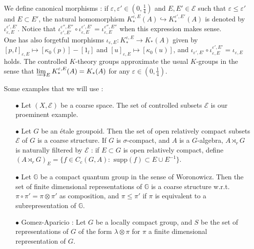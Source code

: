 We define canonical morphisms : if $\varepsilon, \varepsilon'\in (0,\frac{1}{4})$ and $E,E'\in\mathcal E$ such that $\varepsilon \leq \varepsilon'$ and $E \subset E'$, the natural homomorphism $K_*^{\varepsilon,E}(A)\hookrightarrow K_*^{\varepsilon',E'}(A)$ is denoted by $\iota_{\varepsilon,E}^{\varepsilon',E'}$. Notice that $\iota_{\varepsilon',E'}^{\varepsilon'',E''}\circ\iota_{\varepsilon,E}^{\varepsilon',E'}=\iota_{\varepsilon,E}^{\varepsilon'',E''}$ when this expression makes sense.\\

One has also forgetful morphisms $\iota_{\varepsilon,E} : K_*^{\varepsilon,E}\rightarrow K_*(A)$ given by $[p,l]_{\varepsilon,E} \mapsto [\kappa_0(p)]-[1_l]$ and $[u]_{\varepsilon,E} \mapsto [\kappa_0(u)] $, and 
$\iota_{\varepsilon',E'}\circ\iota_{\varepsilon,E}^{\varepsilon',E'}=\iota_{\varepsilon, E}$ holds. The controlled $K$-theory groups approximate the usual $K$-groups in the sense that $\varinjlim_{E} K_*^{\varepsilon,E}(A) = K_*(A)$ for any $\varepsilon\in (0,\frac{1}{4})$.\\

\begin{Expl} Some examples that we will use :\\
\begin{itemize}
\item[$\bullet$] Let $(X,\mathcal E)$ be a coarse space. The set of controlled subsets $\mathcal E$ is our proeminent example.
\item[$\bullet$] Let $G$ be an étale groupoid. Then the set of open relatively compact subsets $\mathcal E$ of $G$ is a coarse structure. If $G$ is $\sigma$-compact, and $A$ is a $G$-algebra, $A\rtimes_r G$ is naturally filtered by $\mathcal E$ : if $E\subset G$ is open relatively compact, define $(A\rtimes_r G)_E = \{f\in C_c(G,A) : \text{ supp}(f)\subset E\cup E^{-1}\}$.
\item[$\bullet$] Let $\mathbb G$ be a compact quantum group in the sense of Woronowicz. Then the set of finite dimensional representations of $\mathbb G$ is a coarse structure w.r.t. $\pi\circ \pi'=\pi\otimes \pi'$ as composition, and $\pi\leq\pi'$ if $\pi$ is equivalent to a subrepresentation of $\mathbb G$.
\item[$\bullet$] Gomez-Aparicio : Let $G$ be a locally compact group, and $S$ be the set of representations of $G$ of the form $\lambda\otimes\pi$ for $\pi$ a finite dimensional representation of $G$.\end{itemize}   
\end{Expl}


